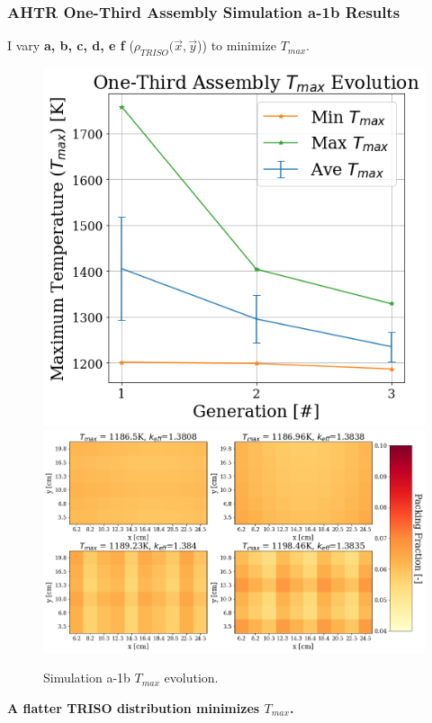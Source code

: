 \begin{frame}
    \frametitle{AHTR One-Third Assembly Simulation a-1b Results}
    I vary \textbf{a, b, c, d, e f} ($\rho_{TRISO}(\vec{x}, \vec{y}$))
    to minimize $T_{max}$. 

    \begin{figure}
        \includegraphics[width=0.39\linewidth]{figures/assem-obj-1-temp-evol-pres.png} 
        \includegraphics[width=0.59\linewidth]{../docs/figures/assem-obj-1-temp-final.png}
        \caption{Simulation a-1b $T_{max}$ evolution.}
    \end{figure}

    \begin{tcolorbox}[colback=illiniorange,colframe=illiniorange!50!black]
        \textbf{A flatter TRISO distribution minimizes $T_{max}$.}
    \end{tcolorbox}
\end{frame}

